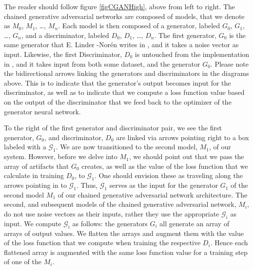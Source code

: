 \documentclass[conference]{IEEEtran}
\begin{document}
The reader should follow figure \ref{figCGANHigh}, above from left to right. The
chained generative adversarial networks are composed of models, that we denote
as $M_{0}$, $M_{1}$, \ldots, $M_{n}$.  Each model is then composed of a
generator, labeled $G_{0}$, $G_{1}$, \ldots, $G_{n}$, and a discriminator,
labeled $D_{0}$, $D_{1}$, \ldots, $D_{n}$.  The first generator, $G_{0}$ is the
same generator that E. Linder -Nor\'en writes in \cite{kerasdcgan}, and it takes
a noise vector as input.  Likewise, the first Discriminator, $D_{0}$ is
untouched from the implementation in \cite{kerasdcgan}, and it takes input from
both some dataset, and the generator $G_{0}$.  Please note the bidirectional
arrows linking the generators and discriminators in the diagrams above.  This is
to indicate that the generator's output becomes input for the discriminator, 
as well as to indicate that we compute a loss function value based on the output
of the discriminator that we feed back to the optimizer of the generator neural 
network.  

To the right of the first generator and discriminator pair, we see the first
generator, $G_{0}$, and discriminator, $D_{0}$ are linked via arrows pointing
right to a box labeled with a $\mathcal{G}_{1}$. We are now transitioned to the
second model, $M_{1}$, of our system.  However, before we delve into $M_{1}$, we
should point out that we pass the array of artifacts that $G_{0}$ creates, as
well as the value of the loss function that we calculate in training $D_{0}$, to 
$\mathcal{G}_{1}$. One should envision these  as traveling along the arrows
pointing in to $\mathcal{G}_{1}$.  Thus, $\mathcal{G}_{1}$ serves as the input
for the generator $G_{1}$ of the second model $M_{1}$ of our chained generative
adversarial network architecture. The second, and subsequent models of the
chained generative adversarial network, $M_{i}$, do not use noise vectors as
their inputs, rather they use the appropriate $\mathcal{G}_{i}$ as input. We
compute $\mathcal{G}_{i}$ as follows: the generators $G_{i}$ all generate an
array of arrays of output values.  We flatten the arrays and augment them with
the value of the loss function that we compute when training the respective
$D_{i}$.  Hence each flattened array is augmented with the same loss function
value for a training step of one of the $M_{i}$.  
\end{document}

